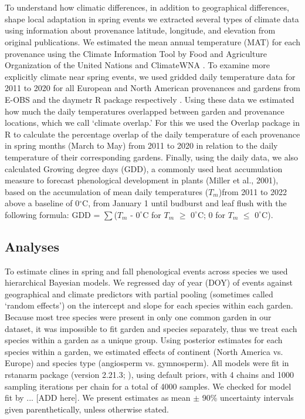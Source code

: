\documentclass{article}
\begin{document}
\\
\\
To understand how climatic differences, in addition to geographical differences, shape local adaptation in spring events we extracted several types of climate data using information about provenance latitude, longitude, and elevation from original publications. We estimated the mean annual temperature (MAT) for each provenance using the Climate Information Tool by Food and Agriculture Organization of the United Nations \citep{FAO2022}and ClimateWNA \citep{wang2016}. To examine more explicitly climate near spring events, we used gridded daily temperature data for 2011 to 2020 for all European and North American provenances and gardens from E-OBS and the daymetr R package respectively \citep{cornes2018,hufkens2018}. Using these data we estimated how much the daily temperatures overlapped between garden and provenance locations, which we call `climate overlap.' For this we used the Overlap package in R to calculate the percentage overlap of the daily temperature of each provenance in spring months (March to May) from 2011 to 2020 in relation to the daily temperature of their corresponding gardens. Finally, using the daily data, we also calculated Growing degree days (GDD), a commonly used heat accumulation measure to forecast phenological development in plants (Miller et al., 2001), based on the accumulation of mean daily temperatures ($T_{m}$)from 2011 to 2022 above a baseline of 0$^{\circ}$C, from January 1 until budburst and leaf flush with the following formula: GDD = $\sum$($T_{m}$ - $0^{\circ}$C for $T_{m}$ $\ge$ $0^{\circ}$C; 0 for $T_{m}$ $\le$ $0^{\circ}$C).

\subsection{Analyses}
To estimate clines in spring and fall phenological events across species we used hierarchical Bayesian models. We regressed day of year (DOY) of events against geographical and climate predictors with partial pooling (sometimes called `random effects') on the intercept and slope for each species within each garden. Because most tree species were present in only one common garden in our dataset, it was impossible to fit garden and species separately, thus we treat each species within a garden as a unique group. Using posterior estimates for each species within a garden, we estimated effects of continent (North America vs. Europe) and species type (angiosperm vs. gymnosperm). All models were fit in rstanarm package (version 2.21.3; \citealp{brilleman2018}), using default priors, with 4 chains and 1000 sampling iterations per chain for a total of 4000 samples. We checked for model fit by ... [ADD here]. We present estimates as mean $\pm$ 90\% uncertainty intervals given parenthetically, unless otherwise stated. 
\end{document}
